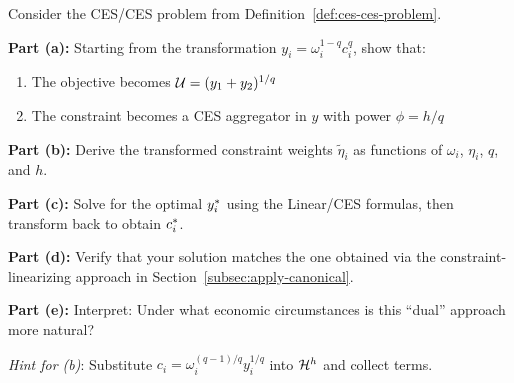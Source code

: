 \begin{tcolorbox}[
    enhanced, breakable,
    colback=gray!5, colframe=gray!50!black,
    title={\textbf{Exercise: Objective-Linearizing Transformation}},
    fonttitle=\bfseries
]
Consider the CES/CES problem from Definition~\ref{def:ces-ces-problem}.

\textbf{Part (a):} Starting from the transformation $y_i = \omega_i^{1-q} c_i^q$, show that:
\begin{enumerate}[label=(\roman*)]
    \item The objective becomes $\mathcal{U} = (y_1 + y_2)^{1/q}$
    \item The constraint becomes a CES aggregator in $y$ with power $\phi = h/q$
\end{enumerate}

\textbf{Part (b):} Derive the transformed constraint weights $\tilde{\eta}_i$ as functions of $\omega_i$, $\eta_i$, $q$, and $h$.

\textbf{Part (c):} Solve for the optimal $y_i^{*}$ using the Linear/CES formulas, then transform back to obtain $c_i^{*}$.

\textbf{Part (d):} Verify that your solution matches the one obtained via the constraint-linearizing approach in Section~\ref{subsec:apply-canonical}.

\textbf{Part (e):} Interpret: Under what economic circumstances is this ``dual'' approach more natural?

\medskip
\emph{Hint for (b)}: Substitute $c_i = \omega_i^{(q-1)/q} y_i^{1/q}$ into $\mathcal{H}^h$ and collect terms.
\end{tcolorbox}

